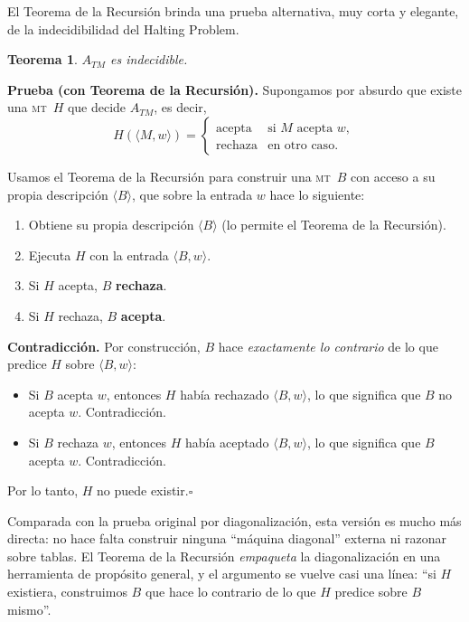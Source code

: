 \documentclass[11pt,a4paper]{article}
\theoremstyle{definicion}
\newtheorem{teorema}[definicion]{Teorema}
\newcommand{\MT}{\textsc{mt}}
\newcommand{\enc}[1]{\langle #1 \rangle}
\begin{document}
El Teorema de la Recursión brinda una prueba alternativa, muy corta y elegante, de la indecidibilidad del Halting Problem.

\begin{teorema}
$A_{TM}$ es indecidible.
\end{teorema}

\textbf{Prueba (con Teorema de la Recursión).} Supongamos por absurdo que existe una \MT\ $H$ que decide $A_{TM}$, es decir,
\[
H(\enc{M, w}) = \begin{cases} \text{acepta} & \text{si } M \text{ acepta } w, \\ \text{rechaza} & \text{en otro caso.} \end{cases}
\]

Usamos el Teorema de la Recursión para construir una \MT\ $B$ con acceso a su propia descripción $\enc{B}$, que sobre la entrada $w$ hace lo siguiente:
\begin{enumerate}
    \item Obtiene su propia descripción $\enc{B}$ (lo permite el Teorema de la Recursión).
    \item Ejecuta $H$ con la entrada $\enc{B, w}$.
    \item Si $H$ acepta, $B$ \textbf{rechaza}.
    \item Si $H$ rechaza, $B$ \textbf{acepta}.
\end{enumerate}

\textbf{Contradicción.} Por construcción, $B$ hace \emph{exactamente lo contrario} de lo que predice $H$ sobre $\enc{B, w}$:
\begin{itemize}
    \item Si $B$ acepta $w$, entonces $H$ había rechazado $\enc{B, w}$, lo que significa que $B$ no acepta $w$. Contradicción.
    \item Si $B$ rechaza $w$, entonces $H$ había aceptado $\enc{B, w}$, lo que significa que $B$ acepta $w$. Contradicción.
\end{itemize}

Por lo tanto, $H$ no puede existir.\hfill$\square$

\begin{idea}
Comparada con la prueba original por diagonalización, esta versión es mucho más directa: no hace falta construir ninguna ``máquina diagonal'' externa ni razonar sobre tablas. El Teorema de la Recursión \emph{empaqueta} la diagonalización en una herramienta de propósito general, y el argumento se vuelve casi una línea: ``si $H$ existiera, construimos $B$ que hace lo contrario de lo que $H$ predice sobre $B$ mismo''.
\end{idea}
\end{document}
